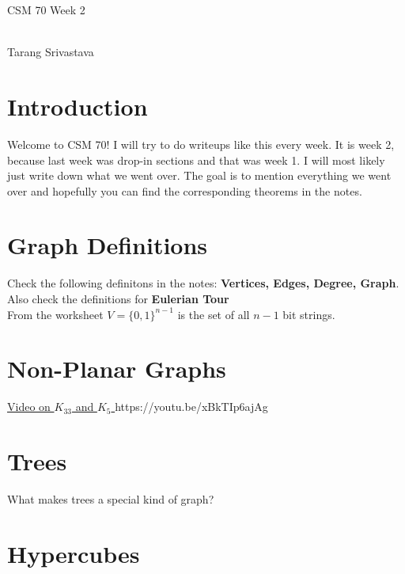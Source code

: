 \documentclass[10pt, twocolumn]{article}
\author{Tarang Srivastava}
\newcommand{\makechaptertitle}[1]{
\begin{center}
	\begin{large}
		#1
	\end{large}
	\begin{small}
		\\Tarang Srivastava
	\end{small}
\end{center}
}
\theoremstyle{definition}
\theoremstyle{definition}
\begin{document}
\makechaptertitle{CSM 70 Week 2}

\section{Introduction}
    Welcome to CSM 70! I will try to do writeups like this every week. 
    It is week 2, because last week was drop-in sections and that was week 1.
    I will most likely just write down what we went over. 
    The goal is to mention everything we went over and hopefully you can find the corresponding theorems in the notes. 
\section{Graph Definitions}
Check the following definitons in the notes: \textbf{Vertices, Edges, Degree, Graph}. 
Also check the definitions for \textbf{Eulerian Tour} \\
From the worksheet $ V = \{0, 1\}^{n-1} $ is the set of all $ n -1 $ bit strings. 
\section{Non-Planar Graphs}
\href{https://youtu.be/xBkTIp6ajAg}{Video on $K_{33}$ and $ K_{5}$ }
https://youtu.be/xBkTIp6ajAg \\

\section{Trees}
What makes trees a special kind of graph? 

\section{Hypercubes}
\end{document}
